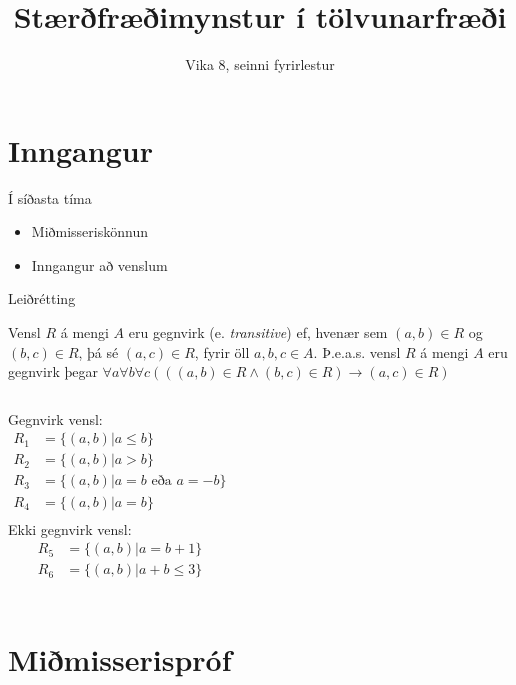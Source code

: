 \documentclass{beamer}
\title{Stærðfræðimynstur í tölvunarfræði}
\subtitle{Vika 8, seinni fyrirlestur}
\begin{document}
\begin{frame}
\titlepage
\end{frame}


\section{Inngangur}

\begin{frame}{Í síðasta tíma}
    \begin{itemize}
        \item Miðmisseriskönnun
        \item Inngangur að venslum
    \end{itemize}
\end{frame}

\begin{frame}[fragile]{Leiðrétting}

\begin{tcolorbox}[title={\color{red}Gegnvirk} vensl]
Vensl $R$ á mengi $A$ eru {\color{red}gegnvirk} (e. \emph{transitive}) ef, hvenær sem $(a, b) \in R$ og $(b, c) \in R$, þá sé $(a, c) \in R$, fyrir öll $a, b, c \in A$. Þ.e.a.s. vensl $R$ á mengi $A$ eru {\color{red}gegnvirk} þegar $\forall a\forall b\forall c(((a, b) \in R \land (b, c) \in R) \to (a, c) \in R)$
\end{tcolorbox}
\begin{columns}
Gegnvirk vensl:
\begin{align*}
R_1 &= \{(a, b)|a \leq b\}\\
R_2 &= \{(a, b)|a > b\}\\
R_3 &= \{(a, b)|a = b \text{ eða } a = -b\}\\
R_4 &= \{(a, b)|a = b\}\\
\end{align*}
Ekki gegnvirk vensl:
\begin{align*}
R_5 &= \{(a, b)|a = b+1\}\\
R_6 &= \{(a, b)|a+b \leq 3\}\\
\end{align*}
\end{columns}
\end{frame}

\section{Miðmisserispróf}
\end{document}
